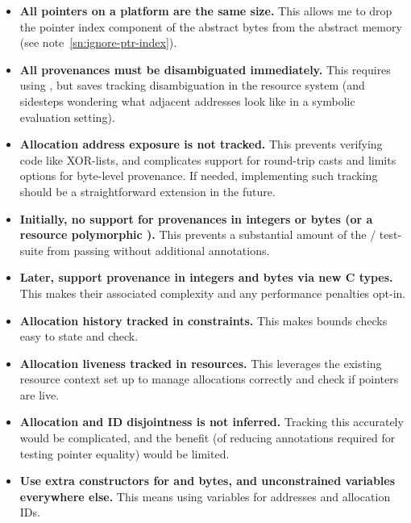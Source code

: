 \begin{itemize}
    \item \textbf{All pointers on a platform are the same size.} This
        allows me to drop the pointer index component of the abstract bytes
        from the abstract memory (see note~\ref{sn:ignore-ptr-index}).
    \item \textbf{All provenances must be disambiguated immediately.} This
        requires using , but saves tracking
        disambiguation in the resource system (and sidesteps wondering what
        adjacent addresses look like in a symbolic evaluation setting).
    \item \textbf{Allocation address exposure is not tracked.} This prevents
        verifying code like XOR-lists, and complicates support for round-trip
        casts and limits options for byte-level provenance. If needed,
        implementing such tracking should be a straightforward extension in the
        future.
    \item \textbf{Initially, no support for provenances in integers or bytes
        (or a resource polymorphic ).}
        This prevents a substantial amount of the /
        test-suite from passing without additional annotations.
    \item \textbf{Later, support provenance in integers and bytes via new C
        types.} This makes their associated complexity and any performance
        penalties opt-in.
    \item \textbf{Allocation history tracked in constraints.} This makes
        bounds checks easy to state and check.
    \item \textbf{Allocation liveness tracked in resources.} This leverages the
        existing resource context set up to manage allocations correctly and
        check if pointers are live.
    \item \textbf{Allocation and ID disjointness is not inferred.} Tracking
        this accurately would be complicated, and the benefit (of reducing
        annotations required for testing pointer equality) would be limited.
    \item \textbf{Use extra constructors for  and
         bytes, and unconstrained variables everywhere
        else.} This means using variables for addresses and allocation IDs.
\end{itemize}
